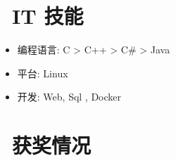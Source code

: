 \documentclass[10pt]{resume}
\begin{document}

\section{\faCogs\ IT 技能}
\begin{itemize}[parsep=0.5ex]
  \item 编程语言: C > C++ > C\# > Java
  \item 平台: Linux
  \item 开发: Web, Sql , Docker
\end{itemize}

\section{\faHeartO\ 获奖情况}


%
%
\end{document}
